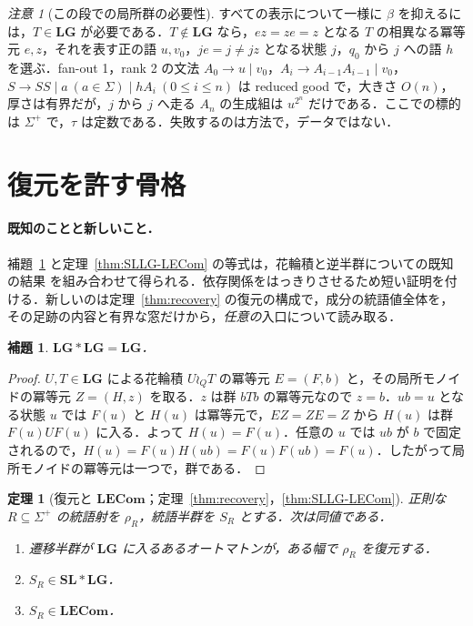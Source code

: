 \documentclass[11pt,a4paper]{ltjsarticle}
\numberwithin{equation}{section}
\theoremstyle{plain}
\newtheorem{lemma}[theorem]{補題}
\theoremstyle{definition}
\theoremstyle{remark}
\newtheorem{remark}[theorem]{注意}
\theoremstyle{plain}
\newtheorem{mainthm}{定理}
\newcommand{\LG}{\mathbf{LG}}
\newcommand{\SL}{\mathbf{SL}}
\newcommand{\LECom}{\mathbf{L}\mathbf{ECom}}
\begin{document}
\begin{remark}[この段での局所群の必要性]
\label{rem:lg-needed-for-witnesses}
すべての表示について一様に $\beta$ を抑えるには，$T\in\LG$ が必要である．$T\notin\LG$ なら，$ez=ze=z$ となる $T$ の相異なる冪等元 $e,z$，それを表す正の語 $u,v_0$，$je=j\ne jz$ となる状態 $j$，$q_0$ から $j$ への語 $h$ を選ぶ．fan-out 1，rank 2 の文法 $A_0\to u\mid v_0$，$A_i\to A_{i-1}A_{i-1}\mid v_0$，$S\to SS\mid a\ (a\in\Sigma)\mid hA_i\ (0\le i\le n)$ は reduced good で，大きさ $O(n)$，厚さは有界だが，$j$ から $j$ へ走る $A_n$ の生成組は $u^{2^n}$ だけである．ここでの標的は $\Sigma^+$ で，$\tau$ は定数である．失敗するのは方法で，データではない．
\end{remark}

\section{復元を許す骨格}
\label{sec:algebra}

\paragraph{既知のことと新しいこと．}
補題~\ref{lem:lg-closed} と定理~\ref{thm:SLLG-LECom} の等式は，花輪積と逆半群についての既知の結果 \cite{TherienWeiss1985,Ash1987,McAlister1974,OCarroll1976,Tilson1987} を組み合わせて得られる．依存関係をはっきりさせるため短い証明を付ける．新しいのは定理~\ref{thm:recovery} の復元の構成で，成分の統語値全体を，その足跡の内容と有界な窓だけから，\emph{任意の}入口について読み取る．

\begin{lemma}
\label{lem:lg-closed}
$\LG*\LG=\LG$．
\end{lemma}

\begin{proof}
$U,T\in\LG$ による花輪積 $U\wr_QT$ の冪等元 $E=(F,b)$ と，その局所モノイドの冪等元 $Z=(H,z)$ を取る．$z$ は群 $bTb$ の冪等元なので $z=b$．$ub=u$ となる状態 $u$ では $F(u)$ と $H(u)$ は冪等元で，$EZ=ZE=Z$ から $H(u)$ は群 $F(u)UF(u)$ に入る．よって $H(u)=F(u)$．任意の $u$ では $ub$ が $b$ で固定されるので，$H(u)=F(u)H(ub)=F(u)F(ub)=F(u)$．したがって局所モノイドの冪等元は一つで，群である．
\end{proof}

\setcounter{mainthm}{2}%
\begin{mainthm}[復元と $\LECom$；定理~\ref{thm:recovery}，\ref{thm:SLLG-LECom}]
\label{thm:C}
正則な $R\subseteq\Sigma^+$ の統語射を $\rho_R$，統語半群を $S_R$ とする．次は同値である．
\begin{enumerate}[label=(\roman*),leftmargin=*]
\item 遷移半群が $\LG$ に入るあるオートマトンが，ある幅で $\rho_R$ を復元する．
\item $S_R\in\SL*\LG$．
\item $S_R\in\LECom$．
\end{enumerate}
\end{mainthm}
\end{document}
